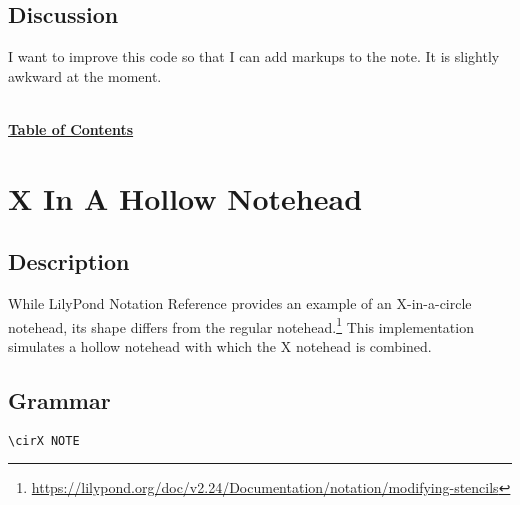 \subsection{Discussion}
I want to improve this code so that I can add markups to the note. It is slightly awkward at the moment.


\hyperref[sec:toc]{\\ \textbf{Table of Contents}}
\clearpage



\section {X In A Hollow Notehead}
\hfill

\subsection{Description}
While LilyPond Notation Reference provides an example of an X-in-a-circle notehead, its shape differs from the regular notehead.\footnote{\url{https://lilypond.org/doc/v2.24/Documentation/notation/modifying-stencils}} This implementation simulates a hollow notehead with which the X notehead is combined.

\subsection{Grammar}
\begin{verbatim}
\cirX NOTE
\end{verbatim}
